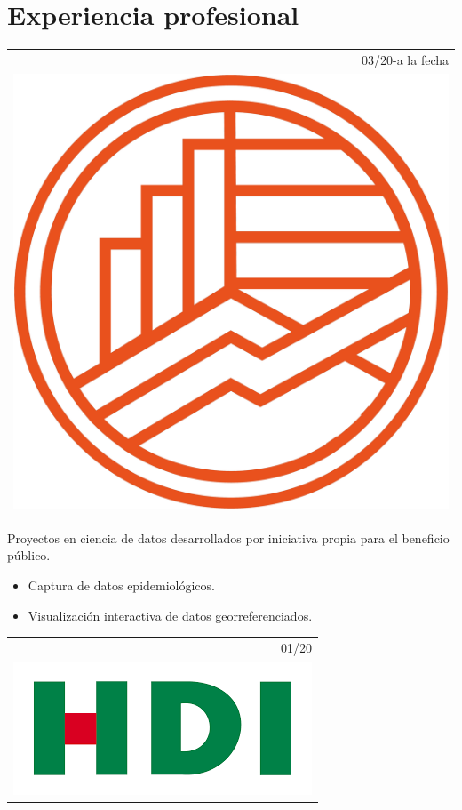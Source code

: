 \documentclass[]{friggeri-cv}
\begin{document}
\section{Experiencia profesional}
\vspace{-0.4cm}
\begin{entrylist}
\entry
   {   \begin{tabular}{r}
    		03/20-a la fecha\\
     		\includegraphics[scale=0.04]{img/Logo_Solo_Figura_Color.png}
	\end{tabular}
    }
    {\vspace{-1.17cm}}
    { }
    {Proyectos en ciencia de datos desarrollados por iniciativa propia para el beneficio público.
    \begin{itemize}
    	\item Captura de datos epidemiológicos.
	\item Visualización interactiva de datos georreferenciados.
\end{itemize}}
\entry
   {   \begin{tabular}{r}
    		01/20\\
     		\hspace{0.87cm}\includegraphics[scale=0.15]{img/hdi.png}

\end{tabular}}
\end{entrylist}
\end{document}
